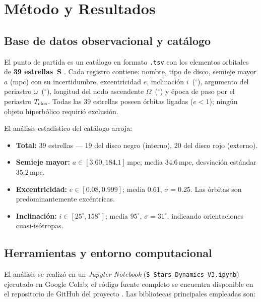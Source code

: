 \documentclass[12pt,a4paper]{article}
\newcommand{\mpc}{\text{mpc}}
\begin{document}
\section{Método y Resultados}
\label{sec:metodo}

\subsection{Base de datos observacional y catálogo}
\label{subsec:catalogo}

El punto de partida es un catálogo en formato \texttt{.tsv} con los elementos
orbitales de \textbf{39 estrellas~S} \citep{vizier_gillessen2017, vizier_ali2020,
ochsenbein2000vizier}.  Cada registro contiene: nombre, tipo de disco, semieje mayor
$a$ (mpc) con su incertidumbre, excentricidad $e$, inclinación $i$~($^\circ$), argumento
del periastro $\omega$~($^\circ$), longitud del nodo ascendente $\Omega$~($^\circ$) y época de paso
por el periastro $T_{\rm clos}$.  Todas las 39 estrellas poseen órbitas ligadas
($e < 1$); ningún objeto hiperbólico requirió exclusión.

El análisis estadístico del catálogo arroja:
\begin{itemize}[itemsep=2pt]
  \item \textbf{Total:} 39 estrellas — 19 del disco negro (interno), 20 del disco rojo
    (externo).
  \item \textbf{Semieje mayor:} $a \in [3.60, 184.1]\,\mpc$; media $34.6\,\mpc$,
    desviación estándar $35.2\,\mpc$.
  \item \textbf{Excentricidad:} $e \in [0.08, 0.999]$; media $0.61$,
    $\sigma = 0.25$.  Las órbitas son predominantemente excéntricas.
  \item \textbf{Inclinación:} $i \in [25^\circ, 158^\circ]$; media $95^\circ$,
    $\sigma = 31^\circ$, indicando orientaciones cuasi-isótropas.
\end{itemize}

\subsection{Herramientas y entorno computacional}
\label{subsec:herramientas}

El análisis se realizó en un \emph{Jupyter Notebook} (\texttt{S\_Stars\_Dynamics\_V3.ipynb})
ejecutado en Google Colab; el código fuente completo se encuentra disponible en el repositorio de
GitHub del proyecto \citep{Soto_Villada_Modelado_N_Cuerpos}.  Las bibliotecas principales empleadas son:
\end{document}

